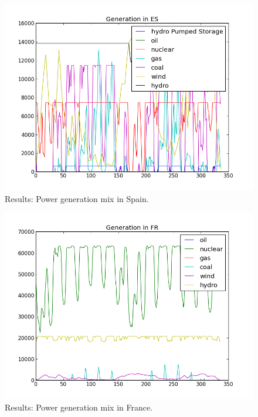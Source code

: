 \documentclass{article}
\begin{document}
\begin{figure}
\centering
\includegraphics[scale=0.6]{example_2w_generationES.png}
\caption{Results: Power generation mix in Spain.}
\label{fig:example_generationES}
\end{figure}

\begin{figure}
\centering
\includegraphics[scale=0.6]{example_2w_generationFR.png}
\caption{Results: Power generation mix in France.}
\label{fig:example_generationFR}
\end{figure}
\end{document}
